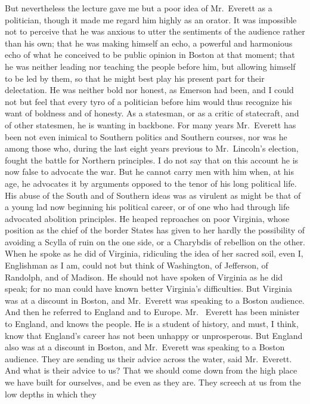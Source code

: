 But nevertheless the lecture gave me but a poor idea of Mr.\ Everett
as a politician, though it made me regard him highly as an orator.
It was impossible not to perceive that he was anxious to utter the
sentiments of the audience rather than his own; that he was making
himself an echo, a powerful and harmonious echo of what he
conceived to be public opinion in Boston at that moment; that he
was neither leading nor teaching the people before him, but
allowing himself to be led by them, so that he might best play his
present part for their delectation.  He was neither bold nor
honest, as Emerson had been, and I could not but feel that every
tyro of a politician before him would thus recognize his want of
boldness and of honesty.  As a statesman, or as a critic of
statecraft, and of other statesmen, he is wanting in backbone.  For
many years Mr.\ Everett has been not even inimical to Southern
politics and Southern courses, nor was he among those who, during
the last eight years previous to Mr.\  Lincoln's election, fought
the battle for Northern principles.  I do not say that on this
account he is now false to advocate the war.  But he cannot carry
men with him when, at his age, he advocates it by arguments opposed
to the tenor of his long political life.  His abuse of the South
and of Southern ideas was as virulent as might be that of a young
lad now beginning his political career, or of one who had through
life advocated abolition principles.  He heaped reproaches on poor
Virginia, whose position as the chief of the border States has
given to her hardly the possibility of avoiding a Scylla of ruin on
the one side, or a Charybdis of rebellion on the other.  When he
spoke as he did of Virginia, ridiculing the idea of her sacred
soil, even I, Englishman as I am, could not but think of
Washington, of Jefferson, of Randolph, and of Madison.  He should
not have spoken of Virginia as he did speak; for no man could have
known better Virginia's difficulties.  But Virginia was at a
discount in Boston, and Mr.\ Everett was speaking to a Boston
audience.  And then he referred to England and to Europe.  Mr.\ %
Everett has been minister to England, and knows the people.  He is
a student of history, and must, I think, know that England's career
has not been unhappy or unprosperous.  But England also was at a
discount in Boston, and Mr.\ Everett was speaking to a Boston
audience.  They are sending us their advice across the water, said
Mr.\ Everett.  And what is their advice to us?  That we should come
down from the high place we have built for ourselves, and be even
as they are.  They screech at us from the low depths in which they
